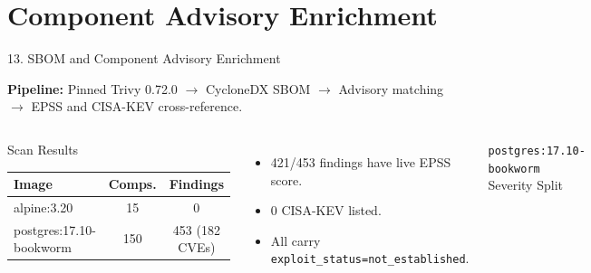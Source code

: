 \documentclass[aspectratio=169,10pt]{beamer}
\begin{document}
\section{Component Advisory Enrichment}
\begin{frame}{13. SBOM and Component Advisory Enrichment}
\small

\textbf{Pipeline:} Pinned Trivy 0.72.0 $\rightarrow$ CycloneDX SBOM $\rightarrow$ Advisory matching $\rightarrow$ EPSS and CISA-KEV cross-reference.

\vspace{0.15cm}

\begin{columns}[T,onlytextwidth]
\begin{block}{Scan Results}
\renewcommand{\arraystretch}{1.3}
\begin{tabularx}{\linewidth}{X c c}
\toprule
\textbf{Image} & \textbf{Comps.} & \textbf{Findings} \\\midrule
alpine:3.20        & 15  & 0   \\
postgres:17.10-bookworm & 150 & 453 (182 CVEs) \\
\bottomrule
\end{tabularx}
\end{block}
\vspace{0.1cm}
\begin{itemize}\setlength{\itemsep}{3pt}\scriptsize
  \item 421/453 findings have live EPSS score.
  \item 0 CISA-KEV listed.
  \item All carry \texttt{exploit\_status=not\_established}.
\end{itemize}

\begin{block}{\texttt{postgres:17.10-bookworm} Severity Split}
\centering
{}
\end{block}
\end{columns}
\end{frame}
\end{document}
